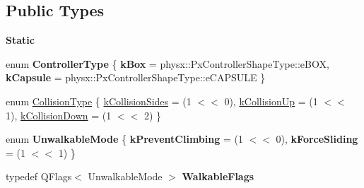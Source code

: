 \subsection*{Public Types}
\begin{Indent}\textbf{ Static}\par
\begin{DoxyCompactItemize}
\item 
\mbox{\label{classrev_1_1_character_controller_a7a554850555108377cecdb4e2dfb2c08}} 
enum {\bfseries Controller\+Type} \{ {\bfseries k\+Box} = physx\+::Px\+Controller\+Shape\+Type\+::e\+B\+OX, 
{\bfseries k\+Capsule} = physx\+::Px\+Controller\+Shape\+Type\+::e\+C\+A\+P\+S\+U\+LE
 \}
\item 
enum \mbox{\hyperlink{classrev_1_1_character_controller_ac4d525bc4df0feaaef505f1756ca7b11}{Collision\+Type}} \{ \mbox{\hyperlink{classrev_1_1_character_controller_ac4d525bc4df0feaaef505f1756ca7b11ac7eca2e7cebb02e8106321f80c310f93}{k\+Collision\+Sides}} = (1 $<$$<$ 0), 
\mbox{\hyperlink{classrev_1_1_character_controller_ac4d525bc4df0feaaef505f1756ca7b11aa5592839aacc369330934ada3ff8483f}{k\+Collision\+Up}} = (1 $<$$<$ 1), 
\mbox{\hyperlink{classrev_1_1_character_controller_ac4d525bc4df0feaaef505f1756ca7b11ad588d108901ee34272b13175ff385c4d}{k\+Collision\+Down}} = (1 $<$$<$ 2)
 \}
\item 
\mbox{\label{classrev_1_1_character_controller_a92a3a65dd2571835150bda501c32b9f2}} 
enum {\bfseries Unwalkable\+Mode} \{ {\bfseries k\+Prevent\+Climbing} = (1 $<$$<$ 0), 
{\bfseries k\+Force\+Sliding} = (1 $<$$<$ 1)
 \}
\item 
\mbox{\label{classrev_1_1_character_controller_ab38aabcdde872edf26784e314d8a959b}} 
typedef Q\+Flags$<$ Unwalkable\+Mode $>$ {\bfseries Walkable\+Flags}
\end{DoxyCompactItemize}
\end{Indent}
